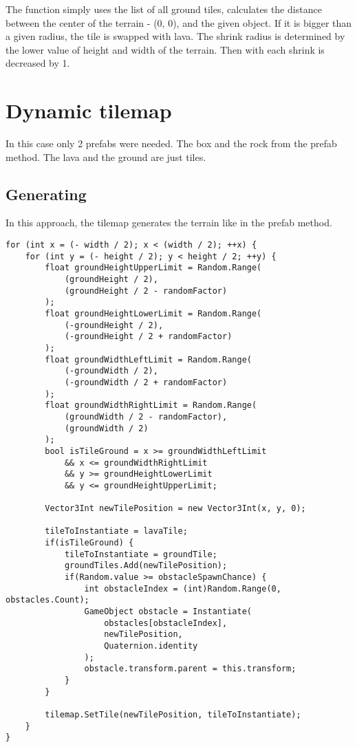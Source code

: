 \documentclass[11pt]{article}
\begin{document}
The function simply uses the list of all ground tiles, calculates the distance between the center of the terrain - (0, 0), and the given object.
If it is bigger than a given radius, the tile is swapped with lava. The shrink radius is determined by the lower value of height and width of the terrain. Then with each shrink is decreased by 1.
\section{Dynamic tilemap}
\label{sec:orgd800c90}
In this case only 2 prefabs were needed. The box and the rock from the prefab method. The lava and the ground are just tiles.
\subsection{Generating}
\label{sec:org6c4c5b4}
In this approach, the tilemap generates the terrain like in the prefab method.

\begin{verbatim}
for (int x = (- width / 2); x < (width / 2); ++x) {
    for (int y = (- height / 2); y < height / 2; ++y) {
        float groundHeightUpperLimit = Random.Range(
            (groundHeight / 2),
            (groundHeight / 2 - randomFactor)
        );
        float groundHeightLowerLimit = Random.Range(
            (-groundHeight / 2),
            (-groundHeight / 2 + randomFactor)
        );
        float groundWidthLeftLimit = Random.Range(
            (-groundWidth / 2),
            (-groundWidth / 2 + randomFactor)
        );
        float groundWidthRightLimit = Random.Range(
            (groundWidth / 2 - randomFactor),
            (groundWidth / 2)
        );
        bool isTileGround = x >= groundWidthLeftLimit
            && x <= groundWidthRightLimit
            && y >= groundHeightLowerLimit
            && y <= groundHeightUpperLimit;

        Vector3Int newTilePosition = new Vector3Int(x, y, 0);

        tileToInstantiate = lavaTile;
        if(isTileGround) {
            tileToInstantiate = groundTile;
            groundTiles.Add(newTilePosition);
            if(Random.value >= obstacleSpawnChance) {
                int obstacleIndex = (int)Random.Range(0, obstacles.Count);
                GameObject obstacle = Instantiate(
                    obstacles[obstacleIndex],
                    newTilePosition,
                    Quaternion.identity
                );
                obstacle.transform.parent = this.transform;
            }
        }

        tilemap.SetTile(newTilePosition, tileToInstantiate);
    }
}
\end{verbatim}
\end{document}
